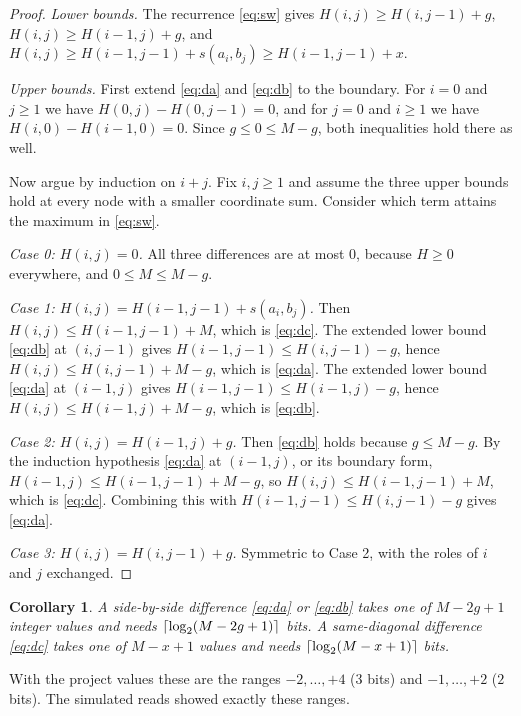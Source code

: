 \documentclass[11pt]{article}
\theoremstyle{plain}
\newtheorem{corollary}[theorem]{Corollary}
\theoremstyle{definition}
\theoremstyle{remark}
\DeclarePairedDelimiter{\ceil}{\lceil}{\rceil}
\begin{document}
\begin{proof}
\emph{Lower bounds.} The recurrence \eqref{eq:sw} gives
$H(i,j) \ge H(i,j-1) + g$, $H(i,j) \ge H(i-1,j) + g$, and
$H(i,j) \ge H(i-1,j-1) + s(a_i,b_j) \ge H(i-1,j-1) + x$.

\emph{Upper bounds.} First extend \eqref{eq:da} and \eqref{eq:db} to the
boundary. For $i = 0$ and $j \ge 1$ we have $H(0,j) - H(0,j-1) = 0$, and for
$j = 0$ and $i \ge 1$ we have $H(i,0) - H(i-1,0) = 0$. Since $g \le 0 \le M - g$,
both inequalities hold there as well.

Now argue by induction on $i + j$. Fix $i, j \ge 1$ and assume the three upper
bounds hold at every node with a smaller coordinate sum. Consider which term
attains the maximum in \eqref{eq:sw}.

\emph{Case 0: $H(i,j) = 0$.} All three differences are at most $0$, because
$H \ge 0$ everywhere, and $0 \le M \le M - g$.

\emph{Case 1: $H(i,j) = H(i-1,j-1) + s(a_i,b_j)$.} Then
$H(i,j) \le H(i-1,j-1) + M$, which is \eqref{eq:dc}. The extended lower bound
\eqref{eq:db} at $(i,j-1)$ gives $H(i-1,j-1) \le H(i,j-1) - g$, hence
$H(i,j) \le H(i,j-1) + M - g$, which is \eqref{eq:da}. The extended lower bound
\eqref{eq:da} at $(i-1,j)$ gives $H(i-1,j-1) \le H(i-1,j) - g$, hence
$H(i,j) \le H(i-1,j) + M - g$, which is \eqref{eq:db}.

\emph{Case 2: $H(i,j) = H(i-1,j) + g$.} Then \eqref{eq:db} holds because
$g \le M - g$. By the induction hypothesis \eqref{eq:da} at $(i-1,j)$, or its
boundary form, $H(i-1,j) \le H(i-1,j-1) + M - g$, so
$H(i,j) \le H(i-1,j-1) + M$, which is \eqref{eq:dc}. Combining this with
$H(i-1,j-1) \le H(i,j-1) - g$ gives \eqref{eq:da}.

\emph{Case 3: $H(i,j) = H(i,j-1) + g$.} Symmetric to Case 2, with the roles of
$i$ and $j$ exchanged.
\end{proof}

\begin{corollary}\label{cor:bits}
A side-by-side difference \eqref{eq:da} or \eqref{eq:db} takes one of
$M - 2g + 1$ integer values and needs $\ceil{\log_2(M - 2g + 1)}$ bits. A
same-diagonal difference \eqref{eq:dc} takes one of $M - x + 1$ values and needs
$\ceil{\log_2(M - x + 1)}$ bits.
\end{corollary}

With the project values these are the ranges $-2,\dots,+4$ ($3$ bits) and
$-1,\dots,+2$ ($2$ bits). The simulated reads showed exactly these ranges.
\end{document}
